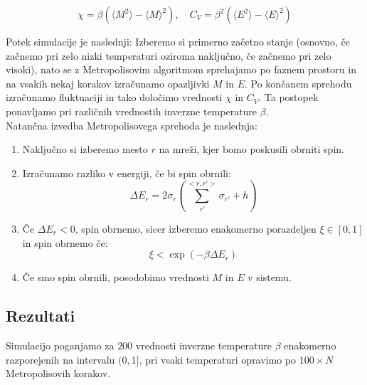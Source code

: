 \documentclass[a4paper]{article}
\newcommand{\s}{\sigma}
\newcommand{\expected}[1]{\langle #1 \rangle}
\newcommand{\D}{\Delta}
\begin{document}
    \begin{equation}\label{eq5}
        \chi = \beta (\expected{M^2} - \expected{M}^2), \quad C_V = \beta^2(\expected{E^2} - \expected{E}^2)
    \end{equation}

    Potek simulacije je naslednji: Izberemo si primerno začetno stanje (osnovno, če začnemo pri
    zelo nizki temperaturi oziroma naključno, če začnemo pri zelo visoki), nato se z Metropolisovim algoritmom
    sprehajamo po faznem prostoru in na vsakih nekaj korakov izračunamo opazljivki $M$ in $E$.
    Po končanem sprehodu izračunamo fluktuaciji in tako določimo vrednosti $\chi$ in $C_V$.
    Ta postopek ponavljamo pri različnih vrednostih inverzne temperature $\beta$. \\

    Natančna izvedba Metropolisovega sprehoda je naslednja:

    \begin{enumerate}
        \item Naključno si izberemo mesto $r$ na mreži, kjer bomo poskusili obrniti spin.

        \item Izračunamo razliko v energiji, če bi spin obrnili:
        \begin{equation}\label{eq6}
        \D E_r = 2\s_r \left( \sum_{r'}^{<r, r'>} \s_{r'} + h \right)
        \end{equation}

        \item Če $\D E_r < 0$, spin obrnemo, sicer izberemo enakomerno porazdeljen $\xi \in [0, 1]$ in spin obrnemo če:
        \begin{equation}\label{eq7}
            \xi < \exp(-\beta \D E_r)
        \end{equation}

        \item Če smo spin obrnili, posodobimo vrednosti $M$ in $E$ v sistemu.

    \end{enumerate}

    \subsection{Rezultati}

    Simulacijo poganjamo za $200$ vrednosti inverzne temperature $\beta$ enakomerno razporejenih na intervalu
    $(0, 1]$, pri vsaki temperaturi opravimo po $100 \times N$ Metropolisovih korakov.\\
\end{document}
